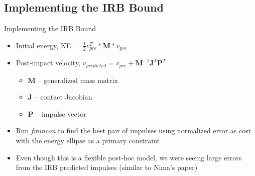 \subsection{Implementing the IRB Bound}
\begin{frame}{Implementing the IRB Bound}
    \begin{itemize}
        \item Initial energy, KE $= \frac{1}{2}v_{pre}^T*\textbf{M}*v_{pre}$
        \item Post-impact velocity, $v_{predicted} = v_{pre} + \textbf{M}^{-1} \textbf{J}^T \textbf{P}^T$
            \begin{itemize}
                \item $\textbf{M}$ -- generalized mass matrix
                \item $\textbf{J}$ -- contact Jacobian
                \item $\textbf{P}$ -- impulse vector
            \end{itemize}
        \item Run \textit{fmincon} to find the best pair of impulses using normalized error as cost with the energy ellipse as a primary constraint
        \item Even though this is a flexible post-hoc model, we were seeing large errors from the IRB predicted impulses (similar to Nima's paper)
        
    \end{itemize}    
\end{frame}



